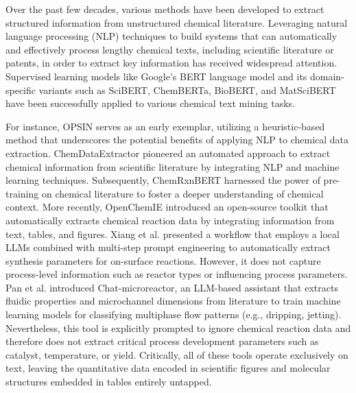 \documentclass[journal=jcisd8,manuscript=article]{achemso}
\begin{document}
Over the past few decades, various methods have been developed to extract structured information from unstructured chemical literature.
Leveraging natural language processing (NLP) techniques to build systems that can automatically and effectively process lengthy chemical texts,
including scientific literature or patents, in order to extract key information has received widespread attention\cite{KURGAN_MUSILEK_2006}.
Supervised learning models like Google’s  BERT  language  model\cite{BERT} and its domain-specific variants such as SciBERT\cite{SciBERT}, ChemBERTa\cite{ChemBERTa},
BioBERT\cite{BioBERT}, and MatSciBERT\cite{MatSciBERT} have been successfully applied to various chemical text mining tasks.

For instance, OPSIN \cite{lowe_2012} serves as an early exemplar, utilizing a heuristic-based method that underscores the potential benefits of applying NLP to chemical data extraction.
ChemDataExtractor \cite{ChemDataExtractor} pioneered an automated approach to extract chemical information from scientific literature by integrating NLP and machine learning techniques.
Subsequently, ChemRxnBERT \cite{Guo2022-tk} harnessed the power of pre-training on chemical literature to foster a deeper understanding of chemical context.
More recently, OpenChemIE \cite{doi:10.1021/acs.jcim.4c00572} introduced an open-source toolkit that automatically extracts chemical reaction data by integrating information from text, tables, and figures.
Xiang et al. \cite{Xiang2025-dp} presented a workflow that employs a local LLMs combined with multi-step prompt engineering to automatically extract synthesis parameters for on-surface reactions.
However, it does not capture process-level information such as reactor types or influencing process parameters.
Pan et al. \cite{Pan2025-sj} introduced Chat-microreactor, an LLM-based assistant that extracts fluidic properties and microchannel dimensions from literature to train machine learning models for classifying multiphase flow patterns (e.g., dripping, jetting).
Nevertheless, this tool is explicitly prompted to ignore chemical reaction data and therefore does not extract critical process development parameters such as catalyst, temperature, or yield.
Critically, all of these tools operate exclusively on text, leaving the quantitative data encoded in scientific figures and molecular structures embedded in tables entirely untapped.
\end{document}
